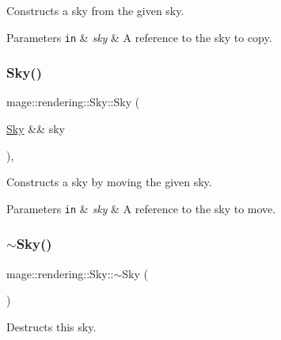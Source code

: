 Constructs a sky from the given sky.


\begin{DoxyParams}[1]{Parameters}
\mbox{\tt in}  & {\em sky} & A reference to the sky to copy. \\
\hline
\end{DoxyParams}
\mbox{\label{classmage_1_1rendering_1_1_sky_aa1484300b69e97812d73e0f5281d8bbc}} 
\subsubsection{\texorpdfstring{Sky()}{Sky()}\hspace{0.1cm}{\footnotesize\ttfamily [3/3]}}
{\footnotesize\ttfamily mage\+::rendering\+::\+Sky\+::\+Sky (\begin{DoxyParamCaption}\item[{\mbox{\hyperlink{classmage_1_1rendering_1_1_sky}{Sky}} \&\&}]{sky }\end{DoxyParamCaption})\hspace{0.3cm}{\ttfamily [default]}, {\ttfamily [noexcept]}}

Constructs a sky by moving the given sky.


\begin{DoxyParams}[1]{Parameters}
\mbox{\tt in}  & {\em sky} & A reference to the sky to move. \\
\hline
\end{DoxyParams}
\mbox{\label{classmage_1_1rendering_1_1_sky_a948ac13394c361864f1da3dc27ab3326}} 
\subsubsection{\texorpdfstring{$\sim$\+Sky()}{~Sky()}}
{\footnotesize\ttfamily mage\+::rendering\+::\+Sky\+::$\sim$\+Sky (\begin{DoxyParamCaption}{ }\end{DoxyParamCaption})\hspace{0.3cm}{\ttfamily [default]}}

Destructs this sky. 

